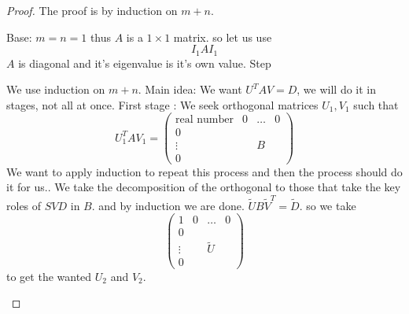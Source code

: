\begin{proof}
The proof is by induction on $m+n$. %
\begin{insight}
Base: $m=n=1$ thus $A$ is a $1\times1$ matrix. so let us use 
\[
I_{1}AI_{1}
\]
 $A$ is diagonal and it's eigenvalue is it's own value. Step%
\end{insight}
\begin{insight}
We use induction on $m+n$. Main idea: We want $U^{T}AV=D$, we will
do it in stages, not all at once. First stage : We seek orthogonal
matrices $U_{1},V_{1}$ such that 
\[
U_{1}^{T}AV_{1}=\left(\begin{array}{c|ccc}
\text{real number} & 0 & \dots & 0\\
\hline 0\\
\vdots &  & B\\
0
\end{array}\right)
\]
We want to apply induction to repeat this process and then the process
should do it for us.. We take the decomposition of the orthogonal
to those that take the key roles of $SVD$ in $B$. and by induction
we are done. $\tilde{U}B\tilde{V}^{T}=\tilde{D}$. so we take 
\[
\left(\begin{array}{c|ccc}
1 & 0 & \dots & 0\\
\hline 0\\
\vdots &  & \tilde{U}\\
0
\end{array}\right)
\]
 to get the wanted $U_{2}$ and $V_{2}$.%
\end{insight}


\end{proof}
